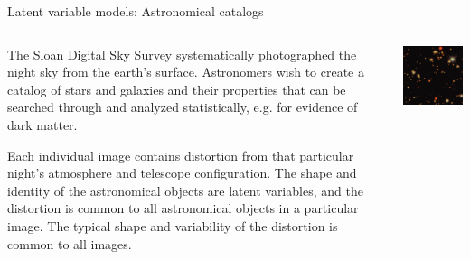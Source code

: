 \begin{frame}{Latent variable models: Astronomical catalogs}

\begin{columns}
    \begin{column}{0.5\textwidth}

The Sloan Digital Sky Survey systematically photographed the night sky
from the earth's surface.  Astronomers wish to create a catalog of stars
and galaxies and their properties that can be searched through and analyzed
statistically, e.g. for evidence of dark matter.
\citep{regier2019cataloging}

\vspace{1em}

Each individual image contains distortion from that particular night's
atmosphere and telescope configuration.  The shape and identity of the
astronomical objects are latent variables, and the distortion is common
to all astronomical objects in a particular image.  The typical shape
and variability of the distortion is common to all images.

    \end{column}
    \begin{column}{0.4\textwidth}
        \includegraphics[width=1.0\textwidth]{static_images/sdss.png}
    \end{column}
\end{columns}


\end{frame}



